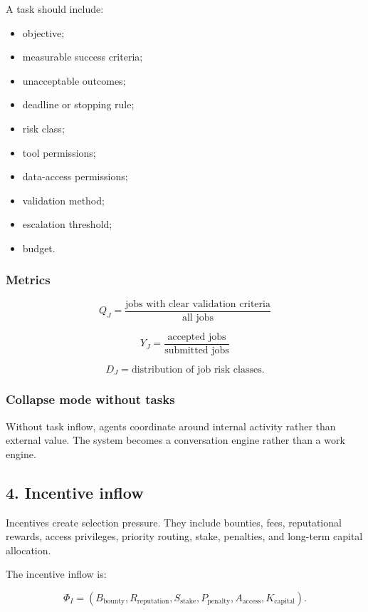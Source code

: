 \documentclass[
  11pt,
]{article}
\providecommand{\tightlist}{%
  \setlength{\itemsep}{0pt}\setlength{\parskip}{0pt}}
\begin{document}
A task should include:

\begin{itemize}
\tightlist
\item
  objective;
\item
  measurable success criteria;
\item
  unacceptable outcomes;
\item
  deadline or stopping rule;
\item
  risk class;
\item
  tool permissions;
\item
  data-access permissions;
\item
  validation method;
\item
  escalation threshold;
\item
  budget.
\end{itemize}

\subsubsection{Metrics}\label{metrics-2}

\[
Q_J=\frac{\text{jobs with clear validation criteria}}{\text{all jobs}}
\]

\[
Y_J=\frac{\text{accepted jobs}}{\text{submitted jobs}}
\]

\[
D_J=\text{distribution of job risk classes}.
\]

\subsubsection{Collapse mode without
tasks}\label{collapse-mode-without-tasks}

Without task inflow, agents coordinate around internal activity rather
than external value. The system becomes a conversation engine rather
than a work engine.

\subsection{4. Incentive inflow}\label{incentive-inflow}

Incentives create selection pressure. They include bounties, fees,
reputational rewards, access privileges, priority routing, stake,
penalties, and long-term capital allocation.

The incentive inflow is:

\[
\Phi_I=(B_{\text{bounty}},R_{\text{reputation}},S_{\text{stake}},P_{\text{penalty}},A_{\text{access}},K_{\text{capital}}).
\]
\end{document}
